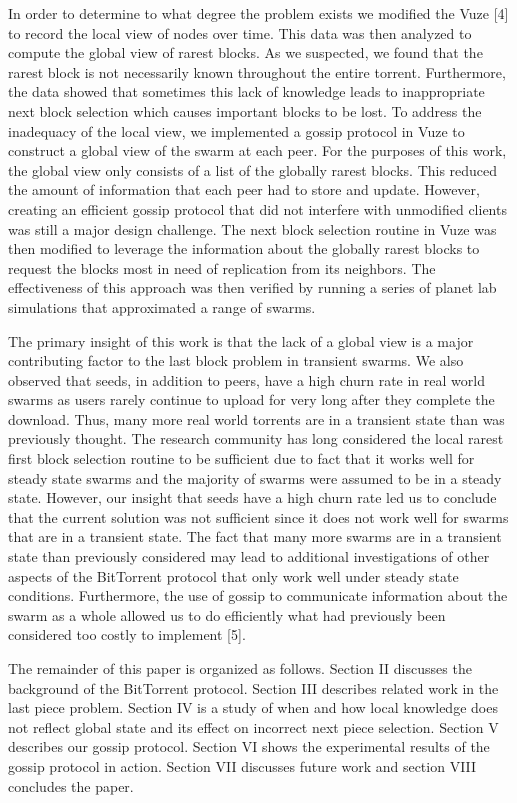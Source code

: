 In order to determine to what degree the problem exists we modified the
Vuze [4] to record the local view of nodes over time. This data was then
analyzed to compute the global view of rarest blocks. As we suspected,
we found that the rarest block is not necessarily known throughout the
entire torrent. Furthermore, the data showed that sometimes this lack
of knowledge leads to inappropriate next block selection which causes
important blocks to be lost. To address the inadequacy of the local view,
we implemented a gossip protocol in Vuze to construct a global view of
the swarm at each peer. For the purposes of this work, the global view
only consists of a list of the globally rarest blocks. This reduced the
amount of information that each peer had to store and update. However,
creating an efficient gossip protocol that did not interfere with
unmodified clients was still a major design challenge. The next block
selection routine in Vuze was then modified to leverage the information
about the globally rarest blocks to request the blocks most in need
of replication from its neighbors. The effectiveness of this approach
was then verified by running a series of planet lab simulations that
approximated a range of swarms.


The primary insight of this work is that the lack of a global view
is a major contributing factor to the last block problem in transient
swarms. We also observed that seeds, in addition to peers, have a high
churn rate in real world swarms as users rarely continue to upload for
very long after they complete the download. Thus, many more real world
torrents are in a transient state than was previously thought. The
research community has long considered the local rarest first block
selection routine to be sufficient due to fact that it works well for
steady state swarms and the majority of swarms were assumed to be in
a steady state. However, our insight that seeds have a high churn rate
led us to conclude that the current solution was not sufficient since
it does not work well for swarms that are in a transient state. The fact
that many more swarms are in a transient state than previously considered
may lead to additional investigations of other aspects of the BitTorrent
protocol that only work well under steady state conditions. Furthermore,
the use of gossip to communicate information about the swarm as a whole
allowed us to do efficiently what had previously been considered too
costly to implement [5].


The remainder of this paper is organized as follows. Section II discusses
the background of the BitTorrent protocol. Section III describes related
work in the last piece problem. Section IV is a study of when and how
local knowledge does not reflect global state and its effect on incorrect
next piece selection. Section V describes our gossip protocol. Section VI
shows the experimental results of the gossip protocol in action. Section
VII discusses future work and section VIII concludes the paper.
